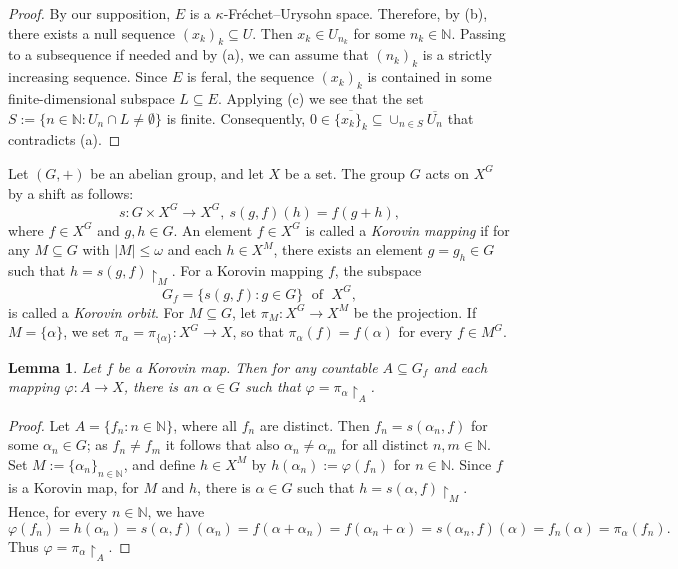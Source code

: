 \documentclass[preprint,11pt]{elsarticle}
\newtheorem{lemma}[theorem]{Lemma}
\theoremstyle{definition}
\theoremstyle{remark}
\numberwithin{equation}{section}
\numberwithin{theorem}{section}
\newcommand{\w}{\omega}
\newcommand{\NN}{\mathbb{N}}
\begin{document}
\begin{proof}
By our supposition, $E$ is a $\kappa$-Fr\'{e}chet--Urysohn space. Therefore, by (b), there exists a null sequence $(x_k)_k\subseteq U$. Then $x_k\in U_{n_k}$ for some $n_k\in \NN$. Passing to a subsequence if needed and by (a),  we can assume that $(n_k)_k$ is a strictly increasing sequence.
Since $E$ is feral, the sequence  $(x_{k})_k$ is contained in some finite-dimensional subspace $L\subseteq E$. Applying (c) we see that the set $S:=\{n\in\NN: U_{n}\cap L\neq\emptyset\}$ is finite. Consequently, $0\in \overline{\{x_{k}\}_k}\subseteq \cup_{n\in S} \overline{U_n}$ that contradicts (a).
\end{proof}




Let $(G,+)$ be an abelian group, and let $X$ be a set. The group $G$ acts on $X^G$ by a shift as follows:
\[
s: G\times X^G \to X^G,\ s(g,f)(h)=f(g+h),
\]
where $f\in X^G$ and $g,h\in G$. An element $f\in X^G$ is called a \emph{Korovin mapping} if for any $M\subseteq G$ with $|M|\leq\w$ and each $h\in X^M$, there exists an element $g=g_h\in G$ such that $h=s(g,f){\restriction}_M$. For a Korovin mapping $f$, the subspace
\[
G_f = \{s(g,f): g\in G\} \; \mbox{ of }\; X^G,
\]
is called a \emph{Korovin orbit}. For $M\subseteq G$, let $\pi_M: X^G\to X^M$ be the projection. If $M=\{\alpha\}$, we set $\pi_\alpha=\pi_{\{\alpha\}}: X^G\to X$, so that $\pi_\alpha(f)=f(\alpha)$ for every $f\in M^G$.



	
\begin{lemma}\label{l:korovin}
Let $f$ be a Korovin map. Then for any countable $A\subseteq G_f$ and each mapping $\varphi: A\to X$, there is an $\alpha\in G$ such that $\varphi=\pi_\alpha{\restriction}_A$.
\end{lemma}

\begin{proof}
Let $A=\{f_n:n\in\NN\}$, where all $f_n$ are distinct. Then $f_n=s(\alpha_n,f)$ for some $\alpha_n\in G$; as $f_n\not= f_m$ it follows that also $\alpha_n\not= \alpha_m$ for all distinct $n,m\in\NN$. Set $M:=\{\alpha_n\}_{n\in\NN}$, and define $h\in X^M$ by $h(\alpha_n):=\varphi(f_n)$ for $n\in\NN$. Since $f$ is a Korovin map, for $M$ and $h$, there is $\alpha\in G$ such that $h=s(\alpha,f){\restriction}_M$. Hence, for every $n\in\NN$, we have
\[
\varphi(f_n)=h(\alpha_n)=s(\alpha,f)(\alpha_n)=f(\alpha+\alpha_n)=f(\alpha_n+\alpha)=s(\alpha_n,f)(\alpha)=f_n(\alpha)=\pi_\alpha(f_n).
\]
Thus $\varphi=\pi_\alpha{\restriction}_A$.
\end{proof}
\end{document}
